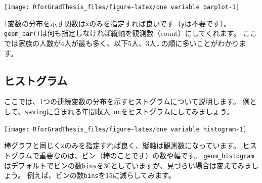 \documentclass[]{book}
\newenvironment{Shaded}{\begin{snugshade}}{\end{snugshade}}
\newcommand{\KeywordTok}[1]{\textcolor[rgb]{0.13,0.29,0.53}{\textbf{#1}}}
\newcommand{\DataTypeTok}[1]{\textcolor[rgb]{0.13,0.29,0.53}{#1}}
\newcommand{\DecValTok}[1]{\textcolor[rgb]{0.00,0.00,0.81}{#1}}
\newcommand{\StringTok}[1]{\textcolor[rgb]{0.31,0.60,0.02}{#1}}
\newcommand{\CommentTok}[1]{\textcolor[rgb]{0.56,0.35,0.01}{\textit{#1}}}
\newcommand{\OperatorTok}[1]{\textcolor[rgb]{0.81,0.36,0.00}{\textbf{#1}}}
\newcommand{\NormalTok}[1]{#1}
\begin{document}
\begin{center}\texttt{[image: RforGradThesis\_files/figure-latex/one variable barplot-1]} \end{center}

1変数の分布を示す関数は\texttt{x}のみを指定すれば良いです（\texttt{y}は不要です）。
\texttt{geom\_bar()}は何も指定しなければ縦軸を観測数（count）にしてくれます。
ここでは家族の人数が4人が最も多く、以下5人、3人\ldots{}の順に多いことがわかります。

\subsection{ヒストグラム}\label{ux30d2ux30b9ux30c8ux30b0ux30e9ux30e0}

ここでは、1つの連続変数の分布を示すヒストグラムについて説明します。
例として、\texttt{saving}に含まれる年間収入\texttt{inc}をヒストグラムにしてみましょう。

\begin{Shaded}
\end{Shaded}

\begin{center}\texttt{[image: RforGradThesis\_files/figure-latex/one variable histogram-1]} \end{center}

棒グラフと同じく\texttt{x}のみを指定すれば良く、縦軸は観測数になっています。
ヒストグラムで重要なのは、ビン（棒のことです）の数や幅です。
\texttt{geom\_histogram}はデフォルトでビンの数\texttt{bins}を30としていますが、見づらい場合は変えてみましょう。
例えば、ビンの数\texttt{bins}を15に減らしてみます。

\begin{Shaded}
\end{Shaded}
\end{document}
